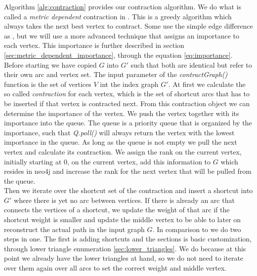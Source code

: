 Algorithm \ref{alg:contraction} provides our contraction algorithm.
We do what is called a \textit{metric dependent} contraction in \cite[Customization Contraction Hierarchies]{CCH}.
This is a greedy algorithm which always takes the next best vertex to contract.
Some use the simple edge difference as \cite[Contraction Hierarchies]{Geisberger_2012}, but we will use
a more advanced technique that assigns an importance to each vertex.
This importance is further described in section \ref{sec:metric_dependent_importance}, through the equation \ref{eq:importance}.
\\
Before starting we have copied $G$ into $G'$ such that both are identical but refer to their own arc and vertex set.
The input parameter of the \textit{contractGraph()} function is the set of vertices $V$ int the index graph $G'$.
At first we calculate the so called \textit{contraction} for each vertex, which is the set of shortcut arcs that has to be inserted if that vertex is contracted next.
From this contraction object we can determine the importance of the vertex.
We push the vertex together with its importance into the queue.
The  queue is a priority queue that is organized by the importance, such that \textit{Q.poll()} will always return the vertex with the lowest importance in the queue.
As long as the queue is not empty we pull the next vertex and calculate its contraction.
We assign the rank on the current vertex, initially starting at 0, on the current vertex, add this information to $G$ which resides in neo4j and increase the rank for the next vertex that will be pulled from the queue.
\\ 
Then we iterate over the shortcut set of the contraction and insert a shortcut into $G'$ where there is yet no arc between vertices.
If there is already an arc that connects the vertices of a shortcut, we update the weight of that arc if the shortcut weight is smaller and update the middle vertex to be able to later on reconstruct the actual path in the input graph $G$.
In comparison to \cite[Customization Contraction Hierarchies]{CCH}  we do two steps in one.
The first is adding shortcuts and the sections is basic customization, through lower triangle enumeration \ref{sec:lower_triangles}.
We do because at this point we already have the lower triangles at hand, so we do not need to iterate over them again over all arcs to set the correct weight and middle vertex.

